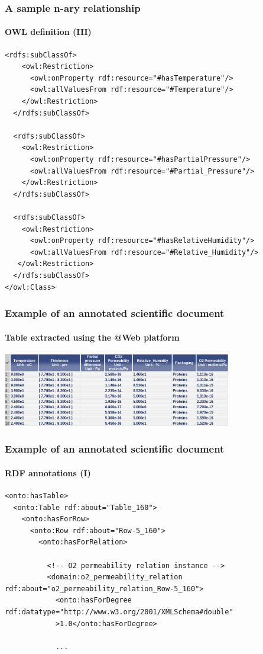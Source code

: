 \documentclass{beamer}
\makeatletter
\newcommand{\atweb}{\textbf{@Web}\xspace}
\makeatother
\begin{document}
\begin{frame}[fragile]
  \frametitle{A sample n-ary relationship}
  \framesubtitle{OWL definition (III)}

  \begin{Verbatim}[fontsize=\scriptsize]
  <rdfs:subClassOf>
    <owl:Restriction>
      <owl:onProperty rdf:resource="#hasTemperature"/>
      <owl:allValuesFrom rdf:resource="#Temperature"/>
    </owl:Restriction>
  </rdfs:subClassOf>

  <rdfs:subClassOf>
    <owl:Restriction>
      <owl:onProperty rdf:resource="#hasPartialPressure"/>
      <owl:allValuesFrom rdf:resource="#Partial_Pressure"/>
    </owl:Restriction>
  </rdfs:subClassOf>

  <rdfs:subClassOf>
    <owl:Restriction>
      <owl:onProperty rdf:resource="#hasRelativeHumidity"/>
      <owl:allValuesFrom rdf:resource="#Relative_Humidity"/>
   </owl:Restriction>
  </rdfs:subClassOf>
</owl:Class>
  \end{Verbatim}
\end{frame}

\begin{frame}
  \frametitle{Example of an annotated scientific document}
  \framesubtitle{Table extracted using the \atweb platform}

  \begin{center}
    \includegraphics[width=10cm]{table.png}
  \end{center}
\end{frame}

\begin{frame}[fragile]
  \frametitle{Example of an annotated scientific document}
  \framesubtitle{RDF annotations (I)}

  \begin{Verbatim}[fontsize=\tiny]
<onto:hasTable>
  <onto:Table rdf:about="Table_160">
    <onto:hasForRow>
      <onto:Row rdf:about="Row-5_160">
        <onto:hasForRelation>

          <!-- O2 permeability relation instance -->
          <domain:o2_permeability_relation rdf:about="o2_permeability_relation_Row-5_160">
            <onto:hasForDegree rdf:datatype="http://www.w3.org/2001/XMLSchema#double"
            >1.0</onto:hasForDegree>

            ...
  \end{Verbatim}
\end{frame}
\end{document}
